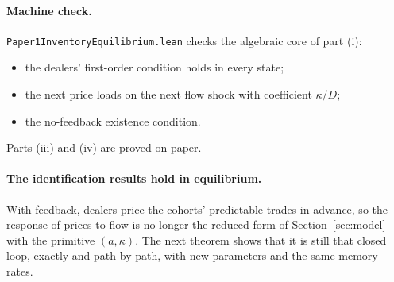 \paragraph{Machine check.} \nolinkurl{Paper1InventoryEquilibrium.lean} checks the algebraic core of part (i):
\begin{itemize}[itemsep=1pt,topsep=2pt]
\item the dealers' first-order condition holds in every state;
\item the next price loads on the next flow shock with coefficient $\kappa/D$;
\item the no-feedback existence condition.
\end{itemize}
Parts (iii) and (iv) are proved on paper.

\paragraph{The identification results hold in equilibrium.} With feedback, dealers price the cohorts' predictable trades in advance, so the response of prices to flow is no longer the reduced form of Section~\ref{sec:model} with the primitive $(a,\kappa)$. The next theorem shows that it is still that closed loop, exactly and path by path, with new parameters and the same memory rates.

